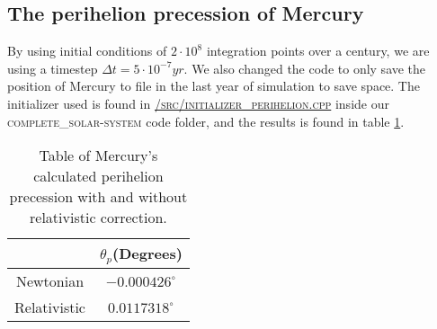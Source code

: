 \documentclass[../main.tex]{subfiles}
\begin{document}
\subsection{The perihelion precession of Mercury}
By using initial conditions of $2 \cdot 10^8$ integration points over a century, we are using a timestep $\Delta t = 5\cdot 10^{-7}yr$. We also changed the code to only save the position of Mercury to file in the last year of simulation to save space. The initializer used is found in \href{https://github.com/kmaasrud/Project-5/blob/master/code/complete_solar-system/src/initialize_perihelion.cpp}{\textsc{/src/initializer\_perihelion.cpp}} inside our \textsc{complete\_solar-system} code folder, and the results is found in table \ref{tab:perihelion}.

\begin{table}[!h]
  \centering
  \begin{tabular}{c c}
    & $\theta_p$(Degrees)\\
    \hline
    Newtonian &  $-0.000426^\circ$\\
    Relativistic &  $0.0117318^\circ$\\
  \end{tabular}
  \caption{Table of Mercury's calculated perihelion precession with and without relativistic correction.}
  \label{tab:perihelion}
\end{table}
\FloatBarrier
\end{document}

